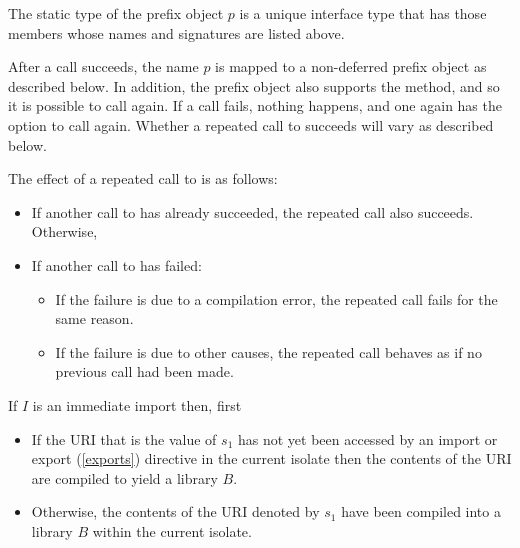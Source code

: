 \documentclass{article}
\begin{document}

The static type of the prefix object $p$ is a unique interface type that has those members whose names and signatures are listed above.

\LMHash{}
After a call succeeds, the name $p$ is mapped to a non-deferred prefix object as described below.
In addition, the prefix object also supports the  method, and so it is possible to call  again.
If a call fails, nothing happens, and one again has the option to call  again.
Whether a repeated call to  succeeds will vary as described below.

\LMHash{}
The effect of a repeated call to  is as follows:
\begin{itemize}
\item
If another call to  has already succeeded, the repeated call also succeeds.
Otherwise,
\item
If another call to  has failed:
\begin{itemize}
\item
If the failure is due to a compilation error, the repeated call fails for the same reason.
\item
If the failure is due to other causes, the repeated call behaves as if no previous call had been made.
\end{itemize}
\end{itemize}


\LMHash{}
If $I$ is an immediate import then, first

\begin{itemize}
\item
If the URI that is the value of $s_1$ has not yet been accessed by an import or export (\ref{exports}) directive in the current isolate then the contents of the URI are compiled to yield a library $B$.
\item Otherwise, the contents of the URI denoted by $s_1$ have been compiled into a library $B$ within the current isolate.
\end{itemize}
\end{document}
